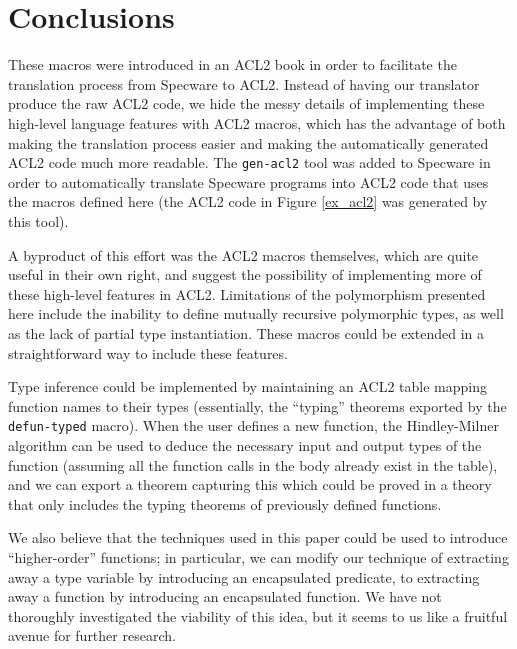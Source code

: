 \documentclass[]{eptcs}
\begin{document}
\section{Conclusions}
These macros were introduced in an ACL2 book in order to facilitate the translation process from Specware to ACL2. Instead of having our translator produce the raw ACL2 code, we hide the messy details of implementing these high-level language features with ACL2 macros, which has the advantage of both making the translation process easier and making the automatically generated ACL2 code much more readable. The \verb|gen-acl2| tool was added to Specware in order to automatically translate Specware programs into ACL2 code that uses the macros defined here (the ACL2 code in Figure \ref{ex_acl2} was generated by this tool). 

A byproduct of this effort was the ACL2 macros themselves, which are quite useful in their own right, and suggest the possibility of implementing more of these high-level features in ACL2. Limitations of the polymorphism presented here include the inability to define mutually recursive polymorphic types, as well as the lack of partial type instantiation. These macros could be extended in a straightforward way to include these  features. 

Type inference could be implemented by maintaining an ACL2 table mapping function names to their types (essentially, the ``typing'' theorems exported by the \verb|defun-typed| macro). When the user defines a new function, the Hindley-Milner algorithm can be used to deduce the necessary input and output types of the function (assuming all the function calls in the body already exist in the table), and we can export a theorem capturing this which could be proved in a theory that only includes the typing theorems of previously defined functions. 

We also believe that the techniques used in this paper could be used to introduce ``higher-order'' functions; in particular, we can modify our technique of extracting away a type variable by introducing an encapsulated predicate, to extracting away a function by introducing an encapsulated function. We have not thoroughly investigated the viability of this idea, but it seems to us like a fruitful avenue for further research.


\clearpage


\end{document}
